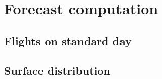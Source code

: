 \section{Forecast computation}
	\subsection{Flights on standard day}
	\subsection{Surface distribution}